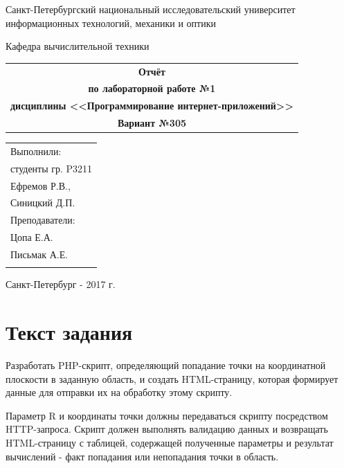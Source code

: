 \documentclass[a4paper, 12pt]{article}
\begin{document}
\begin{titlepage}
\begin{center}
{Санкт-Петербургский национальный исследовательский университет информационных технологий, механики и оптики}

Кафедра вычислительной техники
\end{center}
\vspace{50mm}
\begin{center}
\begin{tabular}{c}
\Huge{\textbf{Отчёт}}\\
\Large{\textbf{по лабораторной работе №1}}\\
\Large{\textbf{дисциплины <<Программирование интернет-приложений>>}}\\
\Large{\textbf{Вариант №305}}\\[2mm]
\end{tabular}
\end{center}
\vspace{85mm}
\begin{flushright}
\begin{tabular}{l}
Выполнили:\\
студенты гр. P3211\\
Ефремов Р.В.,\\
Синицкий Д.П.\\
Преподаватели:\\
Цопа Е.А.\\
Письмак А.Е.\\
\\
\end{tabular}
\end{flushright}
\vspace{15mm}
\begin{center}
Санкт-Петербург - 2017 г.
\end{center}
\end{titlepage}
\newpage

\section{Текст задания}

Разработать PHP-скрипт, определяющий попадание точки на координатной плоскости в заданную область, и создать HTML-страницу, которая формирует данные для отправки их на обработку этому скрипту.

Параметр R и координаты точки должны передаваться скрипту посредством HTTP-запроса. Скрипт должен выполнять валидацию данных и возвращать HTML-страницу с таблицей, содержащей полученные параметры и результат вычислений - факт попадания или непопадания точки в область.
\end{document}
